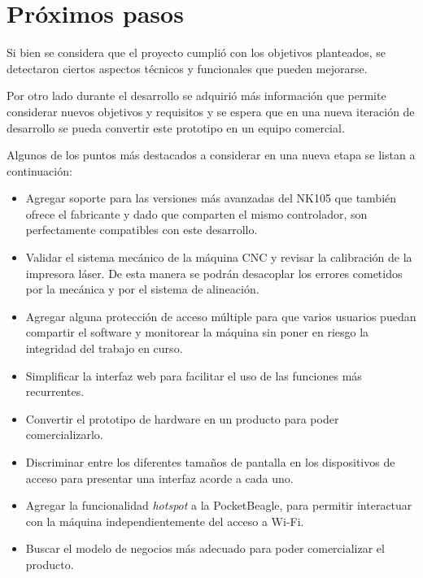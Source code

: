 \section{Próximos pasos}

Si bien se considera que el proyecto cumplió con los objetivos planteados, se detectaron ciertos aspectos técnicos y funcionales que pueden mejorarse.\par
Por otro lado durante el desarrollo se adquirió más información que permite considerar nuevos objetivos y requisitos y se espera que en una nueva iteración de desarrollo se pueda convertir este prototipo en un equipo comercial.\par
Algunos de los puntos más destacados a considerar en una nueva etapa se listan a continuación:

\begin{itemize}
\item{Agregar soporte para las versiones más avanzadas del NK105 que también ofrece el fabricante y dado que comparten el mismo controlador, son perfectamente compatibles con este desarrollo.}

\item{Validar el sistema mecánico de la máquina CNC y revisar la calibración de la impresora láser. De esta manera se podrán desacoplar los errores cometidos por la mecánica y por el sistema de alineación.}

\item{Agregar alguna protección de acceso múltiple para que varios usuarios puedan compartir el software y monitorear la máquina sin poner en riesgo la integridad del trabajo en curso.}

\item{Simplificar la interfaz web para facilitar el uso de las funciones más recurrentes.}

\item{Convertir el prototipo de hardware en un producto para poder comercializarlo.}

\item{Discriminar entre los diferentes tamaños de pantalla en los dispositivos de acceso para presentar una interfaz acorde a cada uno.}

\item{Agregar la funcionalidad \textit{hotspot} a la PocketBeagle, para permitir interactuar con la máquina independientemente del acceso a Wi-Fi.}

\item{Buscar el modelo de negocios más adecuado para poder comercializar el producto.}

\end{itemize}
